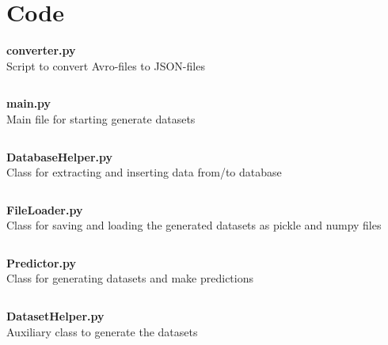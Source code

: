 \chapter{Code}

\textbf{\Large converter.py}\\

Script to convert Avro-files to JSON-files
\inputminted[mathescape,
               linenos,
               numbersep=5pt,
               gobble=2,
               frame=lines,
               framesep=2mm]{python}{../tools/scripts/converter.py}

\newpage

\textbf{\Large main.py}\\

Main file for starting generate datasets
\inputminted[mathescape,
               linenos,
               numbersep=5pt,
               gobble=2,
               frame=lines,
               framesep=2mm]{python}{../tools/main.py}

\newpage
\textbf{\Large DatabaseHelper.py}\\

Class for extracting and inserting data from/to database 
\inputminted[mathescape,
               linenos,
               numbersep=5pt,
               gobble=2,
               frame=lines,
               framesep=2mm]{python}{../tools/DatasetHelper.py}

\newpage
\textbf{\Large FileLoader.py}\\

Class for saving and loading the generated datasets as pickle and numpy files 
\inputminted[mathescape,
               linenos,
               numbersep=5pt,
               gobble=2,
               frame=lines,
               framesep=2mm]{python}{../tools/FileLoader.py}

\newpage
\textbf{\Large Predictor.py}\\

Class for generating datasets and make predictions
\inputminted[mathescape,
               linenos,
               numbersep=5pt,
               gobble=2,
               frame=lines,
               framesep=2mm]{python}{../tools/Predictor.py}

\newpage
\textbf{\Large DatasetHelper.py}\\

Auxiliary class to generate the datasets
\inputminted[mathescape,
               linenos,
               numbersep=5pt,
               gobble=2,
               frame=lines,
               framesep=2mm]{python}{../tools/DatasetHelper.py}

